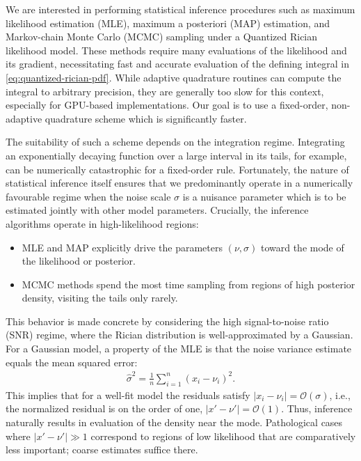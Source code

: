 \documentclass{article}
\begin{document}
We are interested in performing statistical inference procedures such as maximum likelihood estimation (MLE), maximum a posteriori (MAP) estimation, and Markov-chain Monte Carlo (MCMC) sampling under a Quantized Rician likelihood model.
These methods require many evaluations of the likelihood and its gradient, necessitating fast and accurate evaluation of the defining integral in \cref{eq:quantized-rician-pdf}.
While adaptive quadrature routines can compute the integral to arbitrary precision, they are generally too slow for this context, especially for GPU-based implementations.
Our goal is to use a fixed-order, non-adaptive quadrature scheme which is significantly faster.

The suitability of such a scheme depends on the integration regime.
Integrating an exponentially decaying function over a large interval in its tails, for example, can be numerically catastrophic for a fixed-order rule.
Fortunately, the nature of statistical inference itself ensures that we predominantly operate in a numerically favourable regime when the noise scale $\sigma$ is a nuisance parameter which is to be estimated jointly with other model parameters.
Crucially, the inference algorithms operate in high-likelihood regions:
%
\begin{itemize}
  \item MLE and MAP explicitly drive the parameters $(\nu,\sigma)$ toward the mode of the likelihood or posterior.
  \item MCMC methods spend the most time sampling from regions of high posterior density, visiting the tails only rarely.
\end{itemize}
%
This behavior is made concrete by considering the high signal-to-noise ratio (SNR) regime, where the Rician distribution is well-approximated by a Gaussian.
For a Gaussian model, a property of the MLE is that the noise variance estimate equals the mean squared error:
%
\begin{align}
  \hat{\sigma}^2 = \frac{1}{n} \sum_{i=1}^n (x_i - \nu_i)^2.
\end{align}
%
This implies that for a well-fit model the residuals satisfy $|x_i - \nu_i| = \mathcal{O}(\sigma)$, i.e., the normalized residual is on the order of one, $|x' - \nu'| = \mathcal{O}(1)$.
Thus, inference naturally results in evaluation of the density near the mode.
Pathological cases where $|x'-\nu'| \gg 1$ correspond to regions of low likelihood that are comparatively less important;
coarse estimates suffice there.
\end{document}
